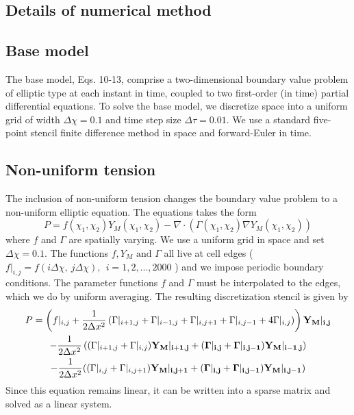 \subsection{Details of numerical method}

\subsection{Base model}

The base model, Eqs. 10-13, comprise a two-dimensional boundary value problem of elliptic type at each instant in time, coupled to two first-order (in time) partial differential equations. To solve the base model, we discretize space into a uniform grid of width $\Delta\chi=0.1$ and time step size $\Delta \tau = 0.01$. We use a standard  five-point stencil finite difference method in space and forward-Euler in time.

\subsection{Non-uniform tension}

The inclusion of non-uniform tension changes the boundary value problem to a non-uniform elliptic equation. The equations takes the form 
\begin{equation}
P  = f(\chi_1,\chi_2) Y_M(\chi_1,\chi_2) -\nabla \cdot \left( \Gamma(\chi_1,\chi_2) \nabla Y_M(\chi_1,\chi_2) \right)
\end{equation}
where $f$ and $\Gamma$ are spatially varying. We use a uniform grid in space and set $\Delta \chi = 0.1$. The functions $f, Y_M \text{ and } \Gamma$ all live at cell edges ($ f|_{i,j} = f(i\Delta \chi,\ j\Delta \chi),\ \ i = 1,2,..., 2000$ ) and we impose periodic boundary conditions. The parameter functions $f$ and $\Gamma$ must be interpolated to the edges, which we do by uniform averaging. The resulting discretization stencil is given by
\begin{multline*}
P  = \left(f|_{i,j} + \dfrac{1}{2\Delta x^2} \left(\Gamma|_{i+1,j}+\Gamma|_{i-1,j}+\Gamma|_{i,j+1}+\Gamma|_{i,j-1}+4\Gamma|_{i,j} \right) \right) \bf{ Y_M|_{i,j}}\\
 - \dfrac{1}{2\Delta x^2} \left( (\Gamma|_{i+1,j}+\Gamma|_{i,j}) \bf{ Y_M|_{i+1,j}} +( \Gamma|_{i,j}+\Gamma|_{i,j-1}) \bf{ Y_M|_{i-1,j}} \right) \\
- \dfrac{1}{2\Delta x^2}  ((\Gamma|_{i,j}+\Gamma|_{i,j+1}) \bf{Y_M|_{i,j+1} } +   (\Gamma|_{i,j}+\Gamma|_{i,j-1}) \bf{  Y_M|_{i,j-1}})
\end{multline*}
Since this equation remains linear, it can be written into a sparse matrix and solved as a linear system.

